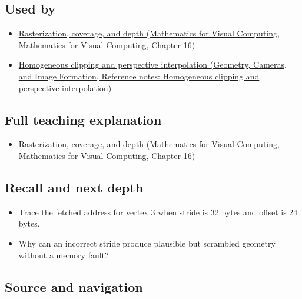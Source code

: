\subsection{Used by}\label{appendix-749ba51a6c25-used-by}

\begin{itemize}
\tightlist
\item
  \href{../02-Mathematics-for-Visual-Computing/main.pdf\#nameddest=03-visual-computing-i-ch012-rasterization-coverage-and-depth}{Rasterization, coverage, and depth (Mathematics for Visual Computing, Mathematics for Visual Computing, Chapter 16)}
\item
  \href{../03-Geometry-Cameras-and-Image-Formation/main.pdf\#nameddest=appendix-40426e4b2103}{Homogeneous clipping and perspective interpolation (Geometry, Cameras, and Image Formation, Reference notes: Homogeneous clipping and perspective interpolation)}
\end{itemize}

\subsection{Full teaching explanation}\label{appendix-749ba51a6c25-full-teaching-explanation}

\begin{itemize}
\tightlist
\item
  \href{../02-Mathematics-for-Visual-Computing/main.pdf\#nameddest=03-visual-computing-i-ch012-rasterization-coverage-and-depth}{Rasterization, coverage, and depth (Mathematics for Visual Computing, Mathematics for Visual Computing, Chapter 16)}
\end{itemize}

\subsection{Recall and next depth}\label{appendix-749ba51a6c25-recall-and-next-depth}

\begin{itemize}
\tightlist
\item
  Trace the fetched address for vertex 3 when stride is 32 bytes and offset is 24 bytes.
\item
  Why can an incorrect stride produce plausible but scrambled geometry without a memory fault?
\end{itemize}

\subsection{Source and navigation}\label{appendix-749ba51a6c25-source-and-navigation}

